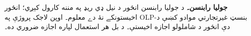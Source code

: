 \textbf{جوليا رابنسن۔} د جوليا رابنسن انځور د نيل ډي ريډ په مننه کارول کېږي؛ انځور اخيستونکے نۀ دے معلوم۔ اوپن لاجک پروژې په OLP-بنسټ غيرتجارتي موادو کښې د دې انځور د شاملولو اجازه اخيستې۔ د بل هر استعمال لپاره اجازه ضروري ده۔

